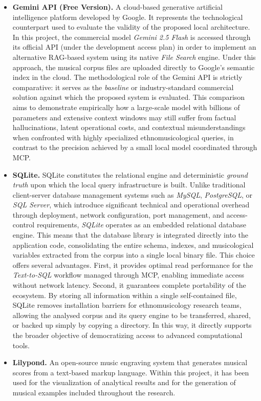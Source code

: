 \begin{itemize}
\item \textbf{Gemini API (Free Version).} A cloud-based generative artificial intelligence platform developed by Google. It represents the technological counterpart used to evaluate the validity of the proposed local architecture. In this project, the commercial model \textit{Gemini 2.5 Flash} is accessed through its official API (under the development access plan) in order to implement an alternative RAG-based system using its native \textit{File Search} engine. Under this approach, the musical corpus files are uploaded directly to Google's semantic index in the cloud. The methodological role of the Gemini API is strictly comparative: it serves as the \textit{baseline} or industry-standard commercial solution against which the proposed system is evaluated. This comparison aims to demonstrate empirically how a large-scale model with billions of parameters and extensive context windows may still suffer from factual hallucinations, latent operational costs, and contextual misunderstandings when confronted with highly specialized ethnomusicological queries, in contrast to the precision achieved by a small local model coordinated through MCP.

\item \textbf{SQLite.} SQLite constitutes the relational engine and deterministic \textit{ground truth} upon which the local query infrastructure is built. Unlike traditional client-server database management systems such as \textit{MySQL}, \textit{PostgreSQL}, or \textit{SQL Server}, which introduce significant technical and operational overhead through deployment, network configuration, port management, and access-control requirements, \textit{SQLite} operates as an embedded relational database engine. This means that the database library is integrated directly into the application code, consolidating the entire schema, indexes, and musicological variables extracted from the corpus into a single local binary file. This choice offers several advantages. First, it provides optimal read performance for the \textit{Text-to-SQL} workflow managed through MCP, enabling immediate access without network latency. Second, it guarantees complete portability of the ecosystem. By storing all information within a single self-contained file, SQLite removes installation barriers for ethnomusicology research teams, allowing the analysed corpus and its query engine to be transferred, shared, or backed up simply by copying a directory. In this way, it directly supports the broader objective of democratizing access to advanced computational tools.

\item \textbf{Lilypond.} An open-source music engraving system that generates musical scores from a text-based markup language. Within this project, it has been used for the visualization of analytical results and for the generation of musical examples included throughout the research.
\end{itemize}


